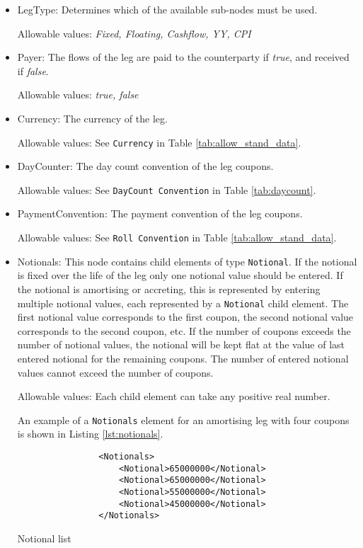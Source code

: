 \begin{itemize}
\item LegType:  Determines which of the available sub-nodes must be
  used. 

Allowable values:  \emph{Fixed, Floating, Cashflow, YY, CPI}

\item Payer:  The flows of the leg are paid to the counterparty if
  \emph{true}, and received if \emph{false}.  

Allowable values:  \emph{true, false} 

\item Currency: The currency of the leg. 

Allowable values:  See \lstinline!Currency! in Table \ref{tab:allow_stand_data}.

\item DayCounter: The day count convention of the leg coupons. 

Allowable values: See \lstinline!DayCount Convention! in Table \ref{tab:daycount}.

\item PaymentConvention: The payment convention of the leg coupons. 

Allowable values: See \lstinline!Roll Convention! in Table \ref{tab:allow_stand_data}.

\item Notionals: This node contains child elements of type
  \lstinline!Notional!. If the notional is fixed over the life of the
  leg only one notional value should be entered. If the notional is
  amortising or accreting, this is represented by entering multiple
  notional values, each represented by a \lstinline!Notional! child
  element. The first notional value corresponds to the first coupon,
  the second notional value corresponds to the second coupon, etc. If
  the number of coupons exceeds the number of notional values, the
  notional will be kept flat at the value of last entered notional for
  the remaining coupons.  The number of entered notional values cannot
  exceed the number of coupons.

Allowable values: Each child element can take any positive real number.

\vspace{1em}

An example of a \lstinline!Notionals! element for an amortising leg with four coupons is shown in Listing \ref{lst:notionals}.
\begin{listing}[H]
\begin{verbatim}
                <Notionals>
                    <Notional>65000000</Notional>
                    <Notional>65000000</Notional>
                    <Notional>55000000</Notional>
                    <Notional>45000000</Notional>
                </Notionals>
\end{verbatim}
\caption{Notional list}
\label{lst:notionals}
\end{listing}


\end{itemize}
